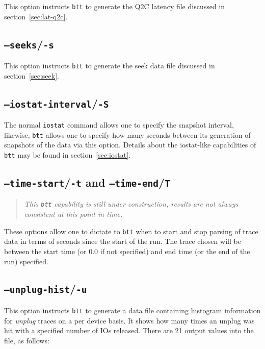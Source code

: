 \documentclass{article}
\begin{document}
  This option instructs \texttt{btt} to generate the Q2C latency file
  discussed in section~\ref{sec:lat-q2c}.

\subsection{\label{sec:o-s}\texttt{--seeks}/\texttt{-s}}

  This option instructs \texttt{btt} to generate the seek data file
  discussed in section~\ref{sec:seek}.

\subsection{\label{sec:o-S}\texttt{--iostat-interval}/\texttt{-S}}

  The normal \texttt{iostat} command allows one to specify the snapshot
  interval, likewise, \texttt{btt} allows one to specify how many seconds
  between its generation of snapshots of the data via this option. Details
  about the iostat-like capabilities of \texttt{btt} may be found in
  section~\ref{sec:iostat}.

\subsection{\label{sec:o-tT}\texttt{--time-start}/\texttt{-t} and
\texttt{--time-end}/\texttt{T}}

  \begin{quote}
    \emph{This \texttt{btt} capability is still under construction, results are
    not always consistent at this point in time.}
  \end{quote}

  These options allow one to dictate to \texttt{btt} when to start and stop
  parsing of trace data in terms of seconds since the start of the run. The
  trace chosen will be between the start time (or 0.0 if not
  specified) and end time (or the end of the run) specified.

\subsection{\label{sec:o-u}\texttt{--unplug-hist}/\texttt{-u}}

  This option instructs \texttt{btt} to generate a data file containing
  histogram information for \emph{unplug} traces on a per device
  basis. It shows how many times an unplug was hit with a specified
  number of IOs released. There are 21 output values into the file, as
  follows:
\end{document}
